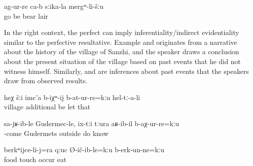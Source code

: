 \begin{exe}
	\ex	\label{ex:‎‎‎(Apparently,) they have gone to the cave of the bear}
	\gll	ag-ur-re	ca-b	sːika-la	mergʷ-li-šːu\\
		go	be	bear	lair\\
	\glt	{}
\end{exe}

In the right context, the perfect can imply inferentiality\slash indirect evidentiality similar to the perfective resultative. Example  and originates from a narrative about the history of the village of Sanzhi, and the speaker draws a conclusion about the present situation of the village based on past events that he did not witness himself. Similarly,  and  are inferences about past events that the speakers draw from observed results.


%
\begin{exe}
	\ex	\label{ex:‎(Apparently,) they have not allowed the village to grow}
	\gll	heχ	šːi	imc'a	b-iχʷ-ij	b-at-ur-re=kːu	hel-tː-a-li\\
			village	additional	be	let	that\\
	\glt	{}

	\ex	\label{ex:‎(Apparently,) when he came to Gudermets he did not know that they had been thrown out (of the village)}
	\gll	sa-jʁ-ib-le	Gudermec-le,		ix-tːi	tːura	aʁ-ib-il	b-aχ-ur-re=kːu\\
		-come	Gudermets		outside	do	know\\
	\glt	{}

	\ex	\label{ex:‎‎(Apparently,) he also has not touched the food, he has not eaten}
	\gll	berkʷijce-li-j=ra	qːuc	Ø-ič-ib-le=kːu		b-erk-un-ne=kːu\\
		food	touch	occur	eat\\
	\glt	{}
\end{exe}

